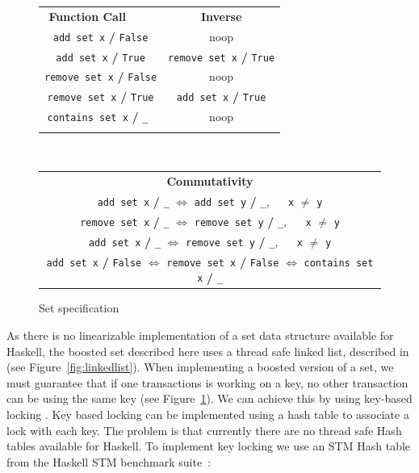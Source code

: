 \documentclass{llncs}
\newcommand{\spc}{\quad \!\!\!\!}
\begin{document}
\begin{figure}[!ht]
\begin{center}
\begin{tabular}{ c c }
  {\bf Function Call}  $\spc\spc$&  {\bf Inverse} \\
  {\tt add set x} {\bf /} {\tt False}  & noop   \\
  {\tt add set x} {\bf /} {\tt True}  & {\tt remove set x} {\bf /} {\tt True}  \\
  {\tt remove set x} {\bf /} {\tt False}  & noop   \\

  {\tt remove set x} {\bf /} {\tt True}  & {\tt add set x} {\bf /} {\tt True}  \\

{\tt contains set x} {\bf /} {\tt \_ }  & noop   \\
 &  \\
\end{tabular}\\
\begin{tabular}{ c }
  {\bf Commutativity}  \\
  {\tt add set x} {\bf /} {\tt \_} $\Leftrightarrow$ {\tt add set y} {\bf /} {\tt \_}, $\spc$ {\tt x} $\neq$ {\tt y}\\
 {\tt remove set x} {\bf /} {\tt \_} $\Leftrightarrow$ {\tt remove set y} {\bf /} {\tt \_}, $\spc$ {\tt x} $\neq$ {\tt y}\\
   {\tt add set x} {\bf /} {\tt \_} $\Leftrightarrow$ {\tt remove set y} {\bf /} {\tt \_}, $\spc$ {\tt x} $\neq$ {\tt y}\\
{\tt add set x} {\bf /} {\tt False} $\Leftrightarrow$ {\tt remove set x} {\bf /} {\tt False} 
$\Leftrightarrow$ {\tt contains set x} {\bf /} {\tt \_}\\
\end{tabular}
\end{center}
\caption{Set specification}
\label{fig:set}
\end{figure}

As there is no linearizable implementation of a set data structure available for Haskell, 
the boosted set described here uses a thread safe linked list, described in \cite{linkedlist} (see Figure~\ref{fig:linkedlist}). 
When implementing a boosted version of a set, we must guarantee that if one transactions is working on a
key, no other transaction can be using the same key (see Figure~\ref{fig:set}).
We can achieve this by using key-based locking \cite{opennesting}. Key based locking can be implemented 
using a hash table to associate a lock with each key. The problem is that currently there  are no
thread safe Hash tables available for Haskell. To implement key
locking we use an STM Hash table from the Haskell STM benchmark suite~\cite{stmbench}:
\end{document}
